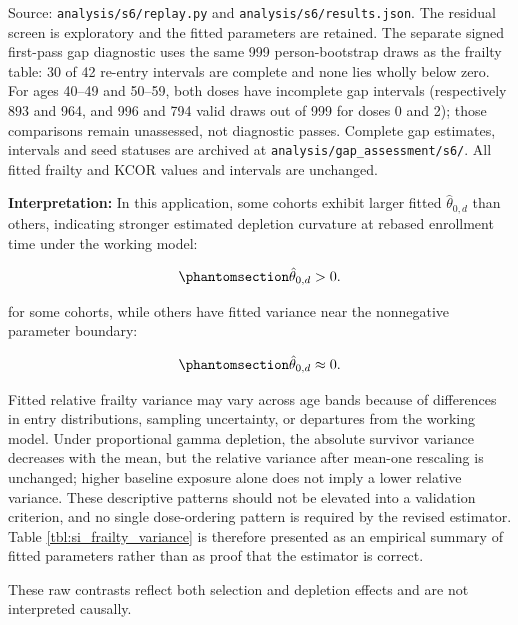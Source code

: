 \documentclass[
]{article}
\newcounter{none} %
\begin{document}
Source: \texttt{analysis/s6/replay.py} and \texttt{analysis/s6/results.json}. The residual screen is exploratory and the fitted parameters are retained. The separate signed first-pass gap diagnostic uses the same 999 person-bootstrap draws as the frailty table: 30 of 42 re-entry intervals are complete and none lies wholly below zero. For ages 40--49 and 50--59, both doses have incomplete gap intervals (respectively 893 and 964, and 996 and 794 valid draws out of 999 for doses 0 and 2); those comparisons remain unassessed, not diagnostic passes. Complete gap estimates, intervals and seed statuses are archived at \texttt{analysis/gap\_assessment/s6/}. All fitted frailty and KCOR values and intervals are unchanged.

\textbf{Interpretation:} In this application, some cohorts exhibit larger fitted \(\hat{\theta}_{0,d}\) than others, indicating stronger estimated depletion curvature at rebased enrollment time under the working model:

\begin{equation}\protect\phantomsection\label{eq:si_theta_positive}{\hat{\theta}_{0,d} > 0.}\end{equation}

for some cohorts, while others have fitted variance near the nonnegative parameter boundary:

\begin{equation}\protect\phantomsection\label{eq:si_theta_near_zero_dose2}{\hat{\theta}_{0,d} \approx 0.}\end{equation}

Fitted relative frailty variance may vary across age bands because of differences in entry distributions, sampling uncertainty, or departures from the working model. Under proportional gamma depletion, the absolute survivor variance decreases with the mean, but the relative variance after mean-one rescaling is unchanged; higher baseline exposure alone does not imply a lower relative variance. These descriptive patterns should not be elevated into a validation criterion, and no single dose-ordering pattern is required by the revised estimator. Table \ref{tbl:si_frailty_variance} is therefore presented as an empirical summary of fitted parameters rather than as proof that the estimator is correct.

These raw contrasts reflect both selection and depletion effects and are not interpreted causally.

\newpage
\end{document}
